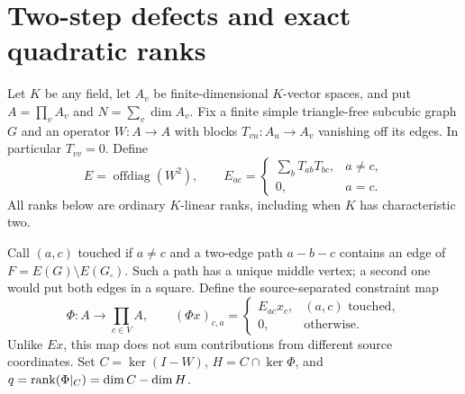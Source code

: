 \section{Two-step defects and exact quadratic ranks}\label{sec:quadratic}
Let $K$ be any field, let $A_v$ be finite-dimensional $K$-vector spaces,
and put $A=\prod_v A_v$ and $N=\sum_v\dim A_v$. Fix a finite simple
triangle-free subcubic graph $G$ and an operator $W:A\to A$ with blocks
$T_{vu}:A_u\to A_v$ vanishing off its edges. In particular $T_{vv}=0$.
Define
\[
 E=\operatorname{offdiag}(W^2),\qquad
 E_{ac}=\begin{cases}\sum_b T_{ab}T_{bc},&a\ne c,\\0,&a=c.\end{cases}
\]
All ranks below are ordinary $K$-linear ranks, including when $K$ has
characteristic two.

Call $(a,c)$ touched if $a\ne c$ and a two-edge path $a-b-c$ contains
an edge of $F=E(G)\setminus E(G_\square)$. Such a path has a unique
middle vertex; a second one would put both edges in a square. Define
the source-separated constraint map
\[
 \Phi:A\longrightarrow\prod_{c\in V}A,\qquad
 (\Phi x)_{c,a}=
 \begin{cases}E_{ac}x_c,&(a,c)\text{ touched},\\0,&\text{otherwise}.
 \end{cases}
\]
Unlike $Ex$, this map does not sum contributions from different source
coordinates. Set $C=\ker(I-W)$, $H=C\cap\ker\Phi$, and
$q=\operatorname{rank}(\Phi|_C)=\dim C-\dim H$.

